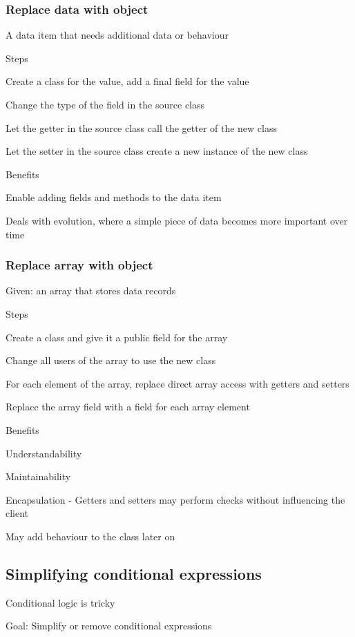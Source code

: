 \documentclass[10pt]{article}
\begin{document}
\subsubsection{Replace data with object}
\enumstart
	\item A data item that needs additional data or behaviour
	\item Steps
	\enumstart
		\item Create a class for the value, add a final field for the value
		\item Change the type of the field in the source class
		\item Let the getter in the source class call the getter of the new class
		\item Let the setter in the source class create a new instance of the new class
	\enumend
	\item Benefits
	\enumstart
		\item Enable adding fields and methods to the data item
		\item Deals with evolution, where a simple piece of data becomes more important over time
	\enumend
\enumend

\subsubsection{Replace array with object}
\enumstart
	\item Given: an array that stores data records
	\item Steps
	\enumstart
		\item Create a class and give it a public field for the array
		\item Change all users of the array to use the new class
		\item For each element of the array, replace direct array access with getters and setters
		\item Replace the array field with a field for each array element
	\enumend
	\item Benefits
	\enumstart
		\item Understandability
		\item Maintainability
		\item Encapsulation - Getters and setters may perform checks without influencing the client
		\item May add behaviour to the class later on
	\enumend
\enumend

\subsection{Simplifying conditional expressions}
\enumstart
	\item Conditional logic is tricky
	\item Goal: Simplify or remove conditional expressions
\enumend
\end{document}
